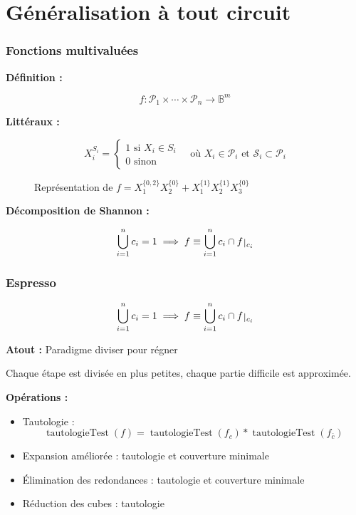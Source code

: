 \documentclass[handout]{beamer}
\newcommand{\ens}[1]{{\lbrace{} #1 \rbrace{}}}
\DeclareMathOperator{\istautology}{tautologieTest}
\def\restriction#1#2{\mathchoice
              {\setbox1\hbox{${\displaystyle #1}_{\scriptstyle #2}$}
              \restrictionaux{#1}{#2}}
              {\setbox1\hbox{${\textstyle #1}_{\scriptstyle #2}$}
              \restrictionaux{#1}{#2}}
              {\setbox1\hbox{${\scriptstyle #1}_{\scriptscriptstyle #2}$}
              \restrictionaux{#1}{#2}}
              {\setbox1\hbox{${\scriptscriptstyle #1}_{\scriptscriptstyle #2}$}
              \restrictionaux{#1}{#2}}}
\def\restrictionaux#1#2{{#1\,\smash{\vrule height .8\ht1 depth .85\dp1}}_{\,#2}}
\begin{document}
\section{Généralisation à tout circuit}
\begin{frame}
  \frametitle{Fonctions multivaluées}

  \textbf{Définition :}
  \begin{mdframed}
  \[ f: \mathcal{P}_1 \times \cdots \times \mathcal{P}_n \longrightarrow \mathbb{B}^m \]
  \end{mdframed}

  \textbf{Littéraux :} 
  \begin{mdframed}
  \[{X_i^{S_i} = %
  \begin{cases}
    1 \text{ si } X_i \in S_i \\
    0 \text{ sinon}
  \end{cases}
  \quad \text{où } X_i \in \mathcal{P}_i \text{ et } \mathcal{S}_i \subset \mathcal{P}_i} \]
    \end{mdframed}  
  
  
  \begin{figure}
  \centering
	  \begin{tikzpicture}[scale=2]  
  		
	  \end{tikzpicture}
	  \caption{Représentation de $f = X_1^\ens{0,2} X_2^\ens{0} + X_1^\ens{1} X_2^\ens{1}X_3^\ens{0}$}
	\end{figure}

  \textbf{Décomposition de Shannon :}
  \begin{mdframed}
  \[ \bigcup_{i=1}^n c_i = 1 \implies f \equiv \bigcup_{i=1}^{n} c_i \cap \restriction{f}{c_i} \]
  \end{mdframed}

\end{frame}



\begin{frame}
  \frametitle{Espresso}

	\begin{mdframed}
  \[ \bigcup_{i=1}^n c_i = 1 \implies f \equiv \bigcup_{i=1}^{n} c_i \cap \restriction{f}{c_i} \]
  \end{mdframed}

  \textbf{Atout :} Paradigme diviser pour régner
  \par Chaque étape est divisée en plus petites, chaque partie difficile est approximée.
  
  \vfill\null
  
  \textbf{Opérations :}  
  \begin{itemize}
  \item Tautologie : 
  \[ \istautology(f) = \istautology(f_c) * \istautology(f_{\bar{c}}) \]
  \item Expansion améliorée : tautologie et couverture minimale
  \item Élimination des redondances : tautologie et couverture minimale
  \item Réduction des cubes : tautologie
  \end{itemize}

  
\end{frame}
\end{document}
